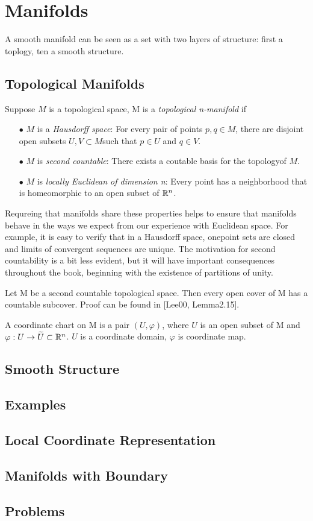 \chapter{Manifolds}
A smooth manifold can be seen as a set with two layers of structure: first a toplogy,
ten a smooth structure.

\section{Topological Manifolds}
\begin{definition} 
Suppose $M$ is a topological space, M is a \emph{topological n-manifold} if
\begin{enumerate}
\item[$\bullet$] $M$ is a \emph{Hausdorff space}: For every pair of points $p,q \in M$, 
there are disjoint open subsets $U,V\subset M$such that $p\in U$ and $q\in V$.
\item[$\bullet$] $M$ is \emph{second countable}: There exists a coutable basis for 
the topologyof $M$.
\item[$\bullet$] $M$ is \emph{locally Euclidean of dimension n}: Every point has a 
neighborhood that is homeomorphic to an open subset of $\mathbb{R}^n$. 
\end{enumerate}
\end{definition}
Requreing that manifolds share these properties helps to ensure that manifolds behave
in the ways we expect from our experience with Euclidean space. For example, it is easy
to verify that in a Hausdorff space, onepoint sets are closed and limits of convergent
sequences are unique. The motivation for second countability is a bit less evident, 
but it will have important consequences throughout the book, beginning with the existence
of partitions of unity.
\begin{lem}
Let M be a second countable topological space. Then every open cover of M has a countable
subcover. Proof can be found in [Lee00, Lemma2.15].
\end{lem}
\begin{definition}
A coordinate chart on M is a pair $(U,\varphi)$, where $U$ is an open subset of M and 
$\varphi:U\rightarrow \widetilde{U}\subset \mathbb{R}^n$. $U$ is a coordinate domain, $\varphi$
is coordinate map.
\end{definition}
\section{Smooth Structure}
\section{Examples}
\section{Local Coordinate Representation}
\section{Manifolds with Boundary}
\section{Problems}